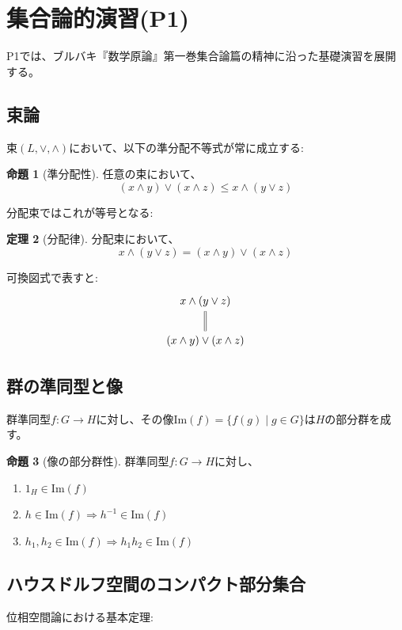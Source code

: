 \documentclass[a4paper,12pt]{ltjsarticle}
\theoremstyle{definition}
\newtheorem{theorem}{定理}[section]
\newtheorem{proposition}[theorem]{命題}
\begin{document}
\section{集合論的演習(P1)}

P1では、ブルバキ『数学原論』第一巻集合論篇の精神に沿った基礎演習を展開する。

\subsection{束論}
束$(L, \vee, \wedge)$において、以下の準分配不等式が常に成立する:

\begin{proposition}[準分配性]\label{prop:subdistributive}
任意の束において、
\[
(x \wedge y) \vee (x \wedge z) \le x \wedge (y \vee z)
\]
\end{proposition}

分配束ではこれが等号となる:

\begin{theorem}[分配律]\label{thm:distributive}
分配束において、
\[
x \wedge (y \vee z) = (x \wedge y) \vee (x \wedge z)
\]
\end{theorem}

可換図式で表すと:
\begin{equation*}
\begin{tikzcd}
x \wedge (y \vee z) \arrow[d, equal] \\
(x \wedge y) \vee (x \wedge z)
\end{tikzcd}
\end{equation*}

\subsection{群の準同型と像}
群準同型$f: G \to H$に対し、その像$\text{Im}(f) = \{f(g) \mid g \in G\}$は$H$の部分群を成す。

\begin{proposition}[像の部分群性]\label{prop:image-subgroup}
群準同型$f: G \to H$に対し、
\begin{enumerate}
\item $1_H \in \text{Im}(f)$
\item $h \in \text{Im}(f) \Rightarrow h^{-1} \in \text{Im}(f)$
\item $h_1, h_2 \in \text{Im}(f) \Rightarrow h_1 h_2 \in \text{Im}(f)$
\end{enumerate}
\end{proposition}

\subsection{ハウスドルフ空間のコンパクト部分集合}
位相空間論における基本定理:
\end{document}
